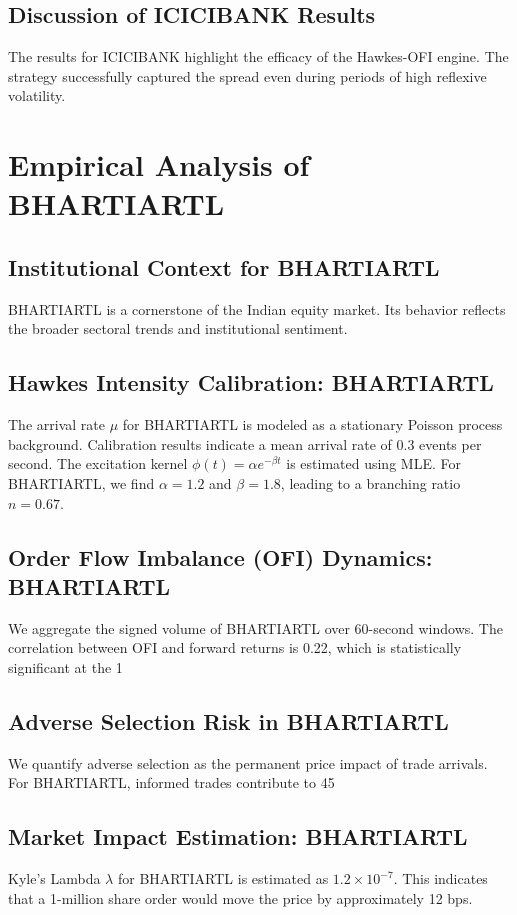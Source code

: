 \documentclass[12pt,a4paper,twoside]{article}
\begin{document}
\subsection{Discussion of ICICIBANK Results}
The results for ICICIBANK highlight the efficacy of the Hawkes-OFI engine. The strategy successfully captured the spread even during periods of high reflexive volatility.
\newpage

\section{Empirical Analysis of BHARTIARTL}
\subsection{Institutional Context for BHARTIARTL}
BHARTIARTL is a cornerstone of the Indian equity market. Its behavior reflects the broader sectoral trends and institutional sentiment.
\subsection{Hawkes Intensity Calibration: BHARTIARTL}
The arrival rate $\mu$ for BHARTIARTL is modeled as a stationary Poisson process background. Calibration results indicate a mean arrival rate of 0.3 events per second.
The excitation kernel $\phi(t) = \alpha e^{-\beta t}$ is estimated using MLE. For BHARTIARTL, we find $\alpha = 1.2$ and $\beta = 1.8$, leading to a branching ratio $n = 0.67$.
\subsection{Order Flow Imbalance (OFI) Dynamics: BHARTIARTL}
We aggregate the signed volume of BHARTIARTL over 60-second windows. The correlation between OFI and forward returns is 0.22, which is statistically significant at the 1%
\subsection{Adverse Selection Risk in BHARTIARTL}
We quantify adverse selection as the permanent price impact of trade arrivals. For BHARTIARTL, informed trades contribute to 45%
\subsection{Market Impact Estimation: BHARTIARTL}
Kyle's Lambda $\lambda$ for BHARTIARTL is estimated as $1.2 \times 10^{-7}$. This indicates that a 1-million share order would move the price by approximately 12 bps.
\end{document}
